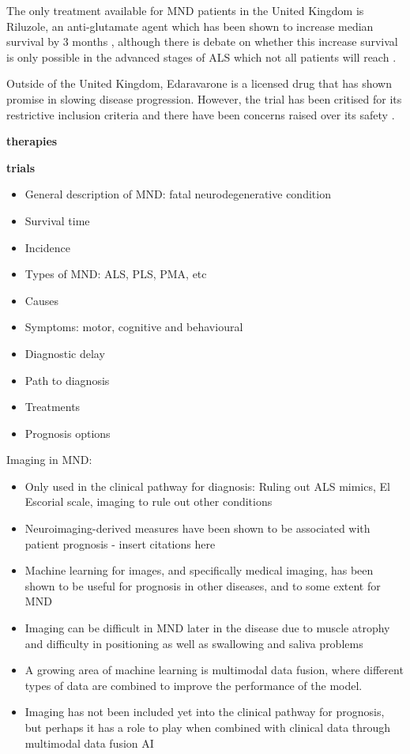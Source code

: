 The only treatment available for MND patients in the United Kingdom is Riluzole, an anti-glutamate agent which has been shown to increase median survival by 3 months \cite{millerRiluzoleAmyotrophicLateral2012, hinchcliffeRiluzoleRealworldEvidence2017}, although there is debate on whether this increase survival is only possible in the advanced stages of ALS which not all patients will reach \cite{andrewsRealworldEvidenceRiluzole2020}.

Outside of the United Kingdom, Edaravarone is a licensed drug that has shown promise in slowing disease progression. However, the trial has been critised for its restrictive inclusion criteria and there have been concerns raised over its safety \cite{witzelSafetyEffectivenessLongterm2022}.



\textbf{therapies}

\textbf{trials}

\begin{itemize}
    \item General description of MND: fatal neurodegenerative condition
    \item Survival time
    \item Incidence
    \item Types of MND: ALS, PLS, PMA, etc
    \item Causes
    \item Symptoms: motor, cognitive and behavioural
    \item Diagnostic delay
    \item Path to diagnosis
    \item Treatments
    \item Prognosis options
\end{itemize}

\noindent Imaging in MND:
\begin{itemize}
    \item Only used in the clinical pathway for diagnosis: Ruling out ALS mimics, El Escorial scale, imaging to rule out other conditions
    \item Neuroimaging-derived measures have been shown to be associated with patient prognosis - insert citations here
    \item Machine learning for images, and specifically medical imaging, has been shown to be useful for prognosis in other diseases, and to some extent for MND
    \item Imaging can be difficult in MND later in the disease due to muscle atrophy and difficulty in positioning as well as swallowing and saliva problems
    \item A growing area of machine learning is multimodal data fusion, where different types of data are combined to improve the performance of the model.
    \item Imaging has not been included yet into the clinical pathway for prognosis, but perhaps it has a role to play when combined with clinical data through multimodal data fusion AI
\end{itemize}


